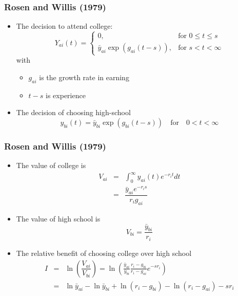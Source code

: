 \documentclass{beamer}
\newcommand{\1}{\mathbb{1}}
\begin{document}
\begin{frame}\frametitle{Rosen and Willis (1979)}
\begin{itemize}
\item The decision to attend college:
\begin{equation*}
Y_{ai}(t) = \begin{cases} 0, & \mbox{for } 0 \leq t \leq s\\ \bar{y}_{ai} \exp(g_{ai}(t-s)), & \mbox{for } s < t < \infty
 \end{cases}
\end{equation*}
with \begin{itemize}
\item $g_{ai}$ is the growth rate in earning
\item $t-s$ is experience
\end{itemize}
\item The decision of choosing high-school
\begin{equation*}
y_{bi}(t) = \bar{y}_{bi} \exp(g_{bi}(t-s)) \quad \text{for} \quad 0<t<\infty
\end{equation*}
\end{itemize}
\end{frame}

\begin{frame}\frametitle{Rosen and Willis (1979)}
\begin{itemize}
\item The value of college is
\begin{eqnarray*}
V_{ai} &=& \int_0^{\infty} y_{ai}(t) e^{-r_i t} dt \\
       &=& \dfrac{\bar{y}_{ai}e^{-r_i s}}{r_i g_{ai}}
\end{eqnarray*}
\item The value of high school is 
\begin{equation*}
V_{bi} = \dfrac{\bar{y}_{bi}}{r_i}
\end{equation*}
\item The relative benefit of choosing college over high school
\begin{eqnarray*}
I &=& \ln \left( \dfrac{V_{ai}}{V_{bi}}\right) = \ln \left( \frac{\bar{y}_{ai}}{\bar{y}_{bi}} \frac{r_i - g_{bi}}{r_i - g_{ai}}  e^{-s r_i}\right) \\
  &=& \ln \bar{y}_{ai} - \ln \bar{y}_{bi} + \ln (r_i -g_{bi}) - \ln (r_i -g_{ai}) -sr_i
 \end{eqnarray*}
\end{itemize}
\end{frame}
\end{document}
